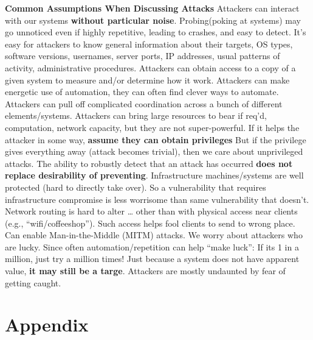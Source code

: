 \documentclass[11 pt]{scrartcl}
\begin{document}
\textbf{Common Assumptions When Discussing Attacks} Attackers can interact with our systems \textbf{without particular noise}. Probing(poking at systems) may go unnoticed even if highly repetitive, leading to crashes, and easy to detect. It’s easy for attackers to know general information about their targets, OS types, software versions, usernames, server ports, IP addresses, usual patterns of activity, administrative procedures. Attackers can obtain access to a copy of a given system to measure and/or determine how it work. Attackers can make energetic use of automation, they can often find clever ways to automate. Attackers can pull off complicated coordination across a bunch of different elements/systems. Attackers can bring large resources to bear if req’d, computation, network capacity, but they are not super-powerful. If it helps the attacker in some way, \textbf{assume they can obtain privileges} But if the privilege gives everything away (attack becomes trivial), then we care about unprivileged attacks. The ability to robustly detect that an attack has occurred \textbf{does not replace desirability of preventing}. Infrastructure machines/systems are well protected (hard to directly take over). So a vulnerability that requires infrastructure compromise is less worrisome than same vulnerability that doesn’t. Network routing is hard to alter … other than with physical access near clients (e.g., “wifi/coffeeshop”). Such access helps fool clients to send to wrong place. Can enable Man-in-the-Middle (MITM) attacks. We worry about attackers who are lucky. Since often automation/repetition can help “make luck”: If its 1 in a million, just try a million times! Just because a system does not have apparent value, \textbf{it may still be a targe}. Attackers are mostly undaunted by fear of getting caught.
\section{Appendix}
\renewcommand{\listtheoremname}{List of Definitions and Theorems}
\listoftheorems[ignoreall,show={theorem,definition}]

\listoftodos
\end{document}
